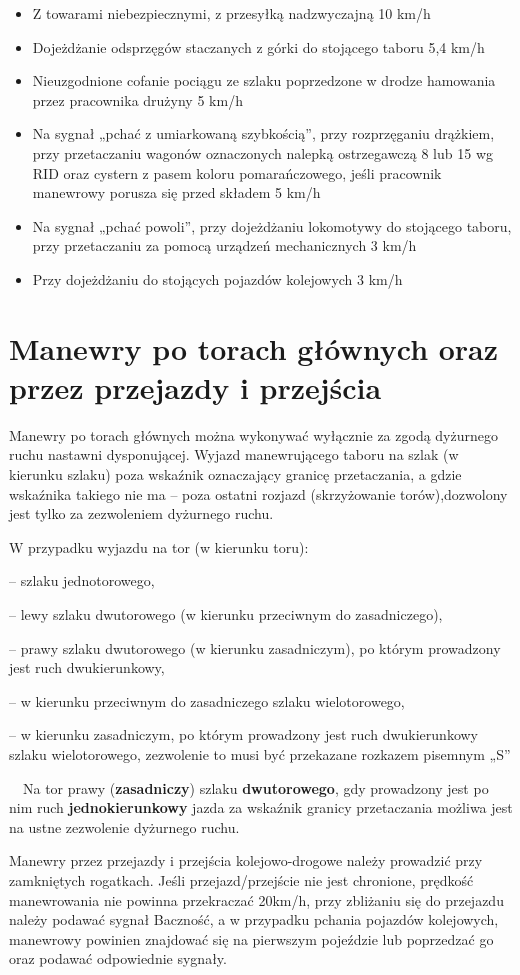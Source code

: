 \begin{itemize}
	\item Z towarami niebezpiecznymi, z przesyłką nadzwyczajną 
	10 km/h
	\item Dojeżdżanie odsprzęgów staczanych z górki do stojącego taboru 
	5,4 km/h
	\item Nieuzgodnione cofanie pociągu ze szlaku poprzedzone w drodze hamowania przez pracownika drużyny 
	5 km/h
	\item Na sygnał „pchać z umiarkowaną szybkością”, przy rozprzęganiu drążkiem, przy przetaczaniu wagonów oznaczonych nalepką ostrzegawczą 8 lub 15 wg RID oraz cystern z pasem koloru pomarańczowego, jeśli pracownik manewrowy porusza się przed składem 
	5 km/h
	\item Na sygnał „pchać powoli”, przy dojeżdżaniu lokomotywy do stojącego taboru, przy przetaczaniu za pomocą urządzeń
	mechanicznych 
	3 km/h
	\item Przy dojeżdżaniu do stojących pojazdów kolejowych 
	3 km/h
\end{itemize}



\chapter{Manewry po torach głównych oraz przez przejazdy i przejścia}

Manewry po torach głównych można wykonywać wyłącznie za zgodą dyżurnego ruchu nastawni dysponującej. Wyjazd manewrującego taboru na szlak (w kierunku szlaku) poza
wskaźnik oznaczający granicę przetaczania, a gdzie wskaźnika takiego nie ma – poza ostatni rozjazd (skrzyżowanie torów),dozwolony jest tylko za zezwoleniem dyżurnego ruchu.

W przypadku wyjazdu na tor (w kierunku toru):

– szlaku jednotorowego,

– lewy szlaku dwutorowego (w kierunku przeciwnym do zasadniczego),

– prawy szlaku dwutorowego (w kierunku zasadniczym), po którym prowadzony jest ruch dwukierunkowy,

– w kierunku przeciwnym do zasadniczego szlaku wielotorowego,

– w kierunku zasadniczym, po którym prowadzony jest ruch dwukierunkowy szlaku wielotorowego, zezwolenie to musi być przekazane rozkazem pisemnym „S”

\ \ Na tor prawy (\textbf{zasadniczy}) szlaku \textbf{dwutorowego}, gdy prowadzony jest po nim ruch \textbf{jednokierunkowy} jazda za wskaźnik granicy przetaczania możliwa jest na ustne zezwolenie dyżurnego ruchu.

Manewry przez przejazdy i przejścia kolejowo-drogowe należy prowadzić przy zamkniętych rogatkach. Jeśli przejazd/przejście nie jest chronione, prędkość manewrowania nie powinna przekraczać 20km/h, przy zbliżaniu się do przejazdu należy podawać sygnał Baczność, a w przypadku pchania pojazdów kolejowych, manewrowy powinien znajdować się na pierwszym pojeździe lub poprzedzać go oraz podawać odpowiednie sygnały.


